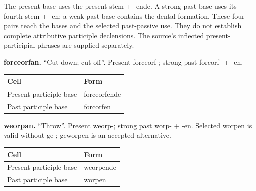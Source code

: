 The present base uses the present stem + -ende. A strong past base uses its fourth stem + -en; a weak past base contains the dental formation. These four pairs teach the bases and the selected past-passive use. They do not establish complete attributive participle declensions. The source’s inflected present-participial phrases are supplied separately.

\textbf{forceorfan.} “Cut down; cut off”. Present forceorf-; strong past forcorf- + -en.

\par\begingroup
\fontsize{10.5}{13.2}\selectfont
\setlength{\LTleft}{0pt}\setlength{\LTright}{\fill}
\noindent
\begin{tabular}{@{}>{\raggedright\arraybackslash}p{68.97mm}>{\raggedright\arraybackslash}p{52.22mm}@{}}
\toprule
\textbf{Cell} & \textbf{Form} \\
\midrule
Present participle base & forceorfende \\
Past participle base & forcorfen \\
\bottomrule
\end{tabular}
\par\endgroup

\textbf{weorpan.} “Throw”. Present weorp-; strong past worp- + -en. Selected worpen is valid without ge-; geworpen is an accepted alternative.

\par\begingroup
\fontsize{10.5}{13.2}\selectfont
\setlength{\LTleft}{0pt}\setlength{\LTright}{\fill}
\noindent
\begin{tabular}{@{}>{\raggedright\arraybackslash}p{74.31mm}>{\raggedright\arraybackslash}p{46.88mm}@{}}
\toprule
\textbf{Cell} & \textbf{Form} \\
\midrule
Present participle base & weorpende \\
Past participle base & worpen \\
\bottomrule
\end{tabular}
\par\endgroup

